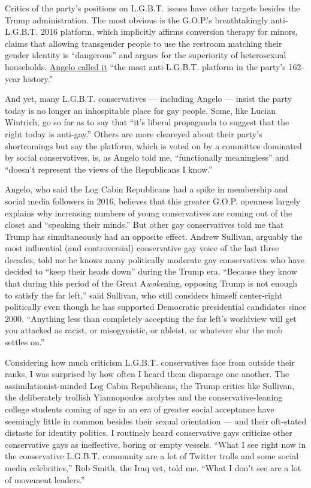 Critics of the party's positions on L.G.B.T. issues have other targets
besides the Trump administration. The most obvious is the G.O.P.'s
breathtakingly anti-L.G.B.T. 2016 platform, which implicitly affirms
conversion therapy for minors, claims that allowing transgender people
to use the restroom matching their gender identity is ``dangerous'' and
argues for the superiority of heterosexual households.
\href{https://abcnews.go.com/Politics/log-cabin-republicans-gop-party-platform-anti-lgbt/story?id=40564850}{Angelo
called it} ``the most anti-L.G.B.T. platform in the party's 162-year
history.''

And yet, many L.G.B.T. conservatives --- including Angelo --- insist the
party today is no longer an inhospitable place for gay people. Some,
like Lucian Wintrich, go so far as to say that ``it's liberal propaganda
to suggest that the right today is anti-gay.'' Others are more cleareyed
about their party's shortcomings but say the platform, which is voted on
by a committee dominated by social conservatives, is, as Angelo told me,
``functionally meaningless'' and ``doesn't represent the views of the
Republicans I know.''

Angelo, who said the Log Cabin Republicans had a spike in membership and
social media followers in 2016, believes that this greater G.O.P.
openness largely explains why increasing numbers of young conservatives
are coming out of the closet and ``speaking their minds.'' But other gay
conservatives told me that Trump has simultaneously had an opposite
effect. Andrew Sullivan, arguably the most influential (and
controversial) conservative gay voice of the last three decades, told me
he knows many politically moderate gay conservatives who have decided to
``keep their heads down'' during the Trump era. ``Because they know that
during this period of the Great A\emph{woke}ning, opposing Trump is not
enough to satisfy the far left,'' said Sullivan, who still considers
himself center-right politically even though he has supported Democratic
presidential candidates since 2000. ``Anything less than completely
accepting the far left's worldview will get you attacked as racist, or
misogynistic, or ableist, or whatever slur the mob settles on.''

Considering how much criticism L.G.B.T. conservatives face from outside
their ranks, I was surprised by how often I heard them disparage one
another. The assimilationist-minded Log Cabin Republicans, the Trump
critics like Sullivan, the deliberately trollish Yiannopoulos acolytes
and the conservative-leaning college students coming of age in an era of
greater social acceptance have seemingly little in common besides their
sexual orientation --- and their oft-stated distaste for identity
politics. I routinely heard conservative gays criticize other
conservative gays as ineffective, boring or empty vessels. ``What I see
right now in the conservative L.G.B.T. community are a lot of Twitter
trolls and some social media celebrities,'' Rob Smith, the Iraq vet,
told me. ``What I don't see are a lot of movement leaders.''

